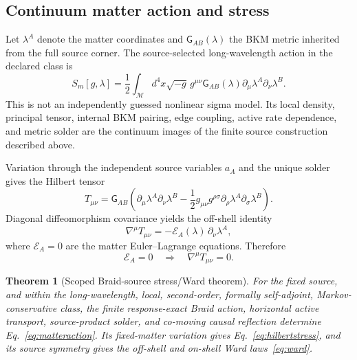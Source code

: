 \documentclass[11pt]{article}
\newtheorem{theorem}{Theorem}[section]
\theoremstyle{definition}
\theoremstyle{remark}
\begin{document}
\subsection{Continuum matter action and stress}

Let $\lambda^A$ denote the matter coordinates and $\mathsf G_{AB}(\lambda)$ the BKM metric inherited from the full source corner. The source-selected long-wavelength action in the declared class is
\begin{equation}\label{eq:matteraction}
 S_m[g,\lambda]=\frac12\int_{\mathcal M}d^4x\sqrt{-g}\,
 g^{\mu\nu}\mathsf G_{AB}(\lambda)
 \partial_{\mu}\lambda^A\partial_{\nu}\lambda^B.
\end{equation}
This is not an independently guessed nonlinear sigma model. Its local density, principal tensor, internal BKM pairing, edge coupling, active rate dependence, and metric solder are the continuum images of the finite source construction described above.

Variation through the independent source variables $a_A$ and the unique solder gives the Hilbert tensor
\begin{equation}\label{eq:hilbertstress}
 T_{\mu\nu}=\mathsf G_{AB}
 \left(
 \partial_{\mu}\lambda^A\partial_{\nu}\lambda^B
 -\frac12g_{\mu\nu}g^{\rho\sigma}
 \partial_{\rho}\lambda^A\partial_{\sigma}\lambda^B
 \right).
\end{equation}
Diagonal diffeomorphism covariance yields the off-shell identity
\begin{equation}\label{eq:ward}
 \nabla^{\mu}T_{\mu\nu}=-\mathcal E_A(\lambda)\,\partial_{\nu}\lambda^A,
\end{equation}
where $\mathcal E_A=0$ are the matter Euler--Lagrange equations. Therefore
\begin{equation}
 \mathcal E_A=0\quad\Longrightarrow\quad\nabla^{\mu}T_{\mu\nu}=0.
\end{equation}

\begin{theorem}[Scoped Braid-source stress/Ward theorem]\label{thm:ward}
For the fixed source, and within the long-wavelength, local, second-order, formally self-adjoint, Markov-conservative class, the finite response-exact Braid action, horizontal active transport, source-product solder, and co-moving causal reflection determine Eq.~\eqref{eq:matteraction}. Its fixed-matter variation gives Eq.~\eqref{eq:hilbertstress}, and its source symmetry gives the off-shell and on-shell Ward laws~\eqref{eq:ward}.
\end{theorem}
\end{document}
